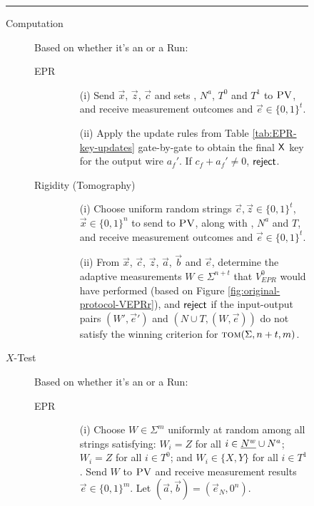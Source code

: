 \begin{figure}[H]
\rule[1ex]{\textwidth}{0.5pt}
\vspace{-20pt}
\begin{description}
\item[Computation] Based on whether it's an  or a  Run:
	\begin{description}
	\item[EPR]
		\begin{enumerate}
		\item[(i)] Send $\vec{x}$, $\vec{z}$, $\vec{c}$ and sets , $N^a$, $T^0$
      and $T^1$ to $\textsc{PV}$, and receive measurement outcomes  and $\vec{e}\in\{0,1\}^t$.
		\item[(ii)] Apply the update rules from Table \ref{tab:EPR-key-updates} gate-by-gate to obtain the final $\sf X$ key for the output wire $a_f'$. If $c_f+a_f'\neq 0$, $\sf reject$. 
		\end{enumerate}
	\item[Rigidity (Tomography)]
		\begin{enumerate}
		\item[(i)] Choose uniform random strings $\vec{c},\vec{z}\in\{0,1\}^t$, $\vec{x} \in \{0,1\}^n$ 
      to send to $\textsc{PV}$, along with , $N^a$ and $T$, and receive measurement outcomes  and $\vec{e}\in\{0,1\}^t$. 
		\item[(ii)]
		From $\vec{x}$, $\vec{c}$, $\vec{z}$, $\vec{a}$, $\vec{b}$ and $\vec{e}$, determine the adaptive measurements $W\in\Sigma^{n+t}$ that $V_{EPR}^0$ would have performed (based on Figure \ref{fig:original-protocol-VEPRr}), and $\sf reject$ if the input-output pairs $(W',\vec{e}')$ and $(N\cup T,(W,\vec{e}))$ do not satisfy the winning criterion for $\textsc{tom}(\Sigma,n+t,m)$.
		\end{enumerate}
	\end{description}
\item[$X$-Test] Based on whether it's an  or a  Run:
\begin{description}
	\item[EPR] 
	\begin{enumerate}
		\item[(i)] Choose $W\in\Sigma^m$ uniformly at random among all strings
      satisfying: $W_i=Z$ for all $i\in \highlight{N^w} \cup N^a$; $W_i=Z$ for all $i\in T^0$; and $W_i\in\{X,Y\}$ for all $i\in T^1$. Send $W$ to $\textsc{PV}$ and receive measurement results $\vec{e}\in\{0,1\}^m$. Let $(\vec{a},\vec{b})=(\vec{e}_N,0^n)$. 

\end{enumerate}
\end{description}
\end{description}
\end{figure}
